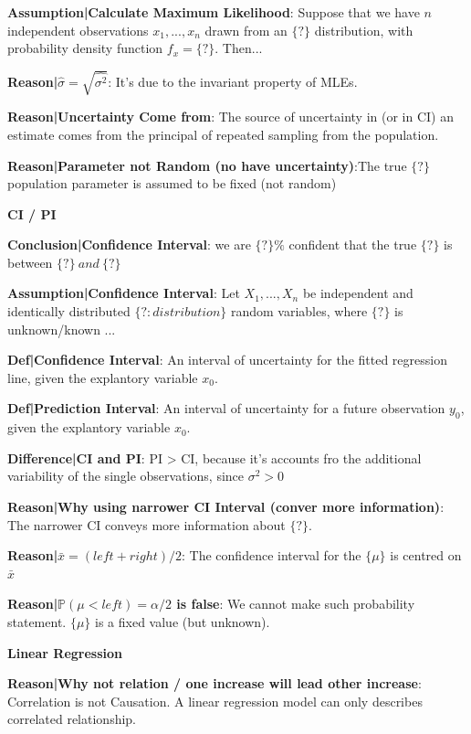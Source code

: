 \documentclass[9pt]{article}
\begin{document}
    \textbf{Assumption|Calculate Maximum Likelihood}: Suppose that we have $n$ independent observations $x_1,...,x_n$ drawn from an $\{?\}$ distribution, with probability density function $f_x=\{?\}$. Then...

    \textbf{Reason|$\hat{\sigma}=\sqrt{\hat{\sigma^2}}$}: It's due to the invariant property of MLEs.

    \textbf{Reason|Uncertainty Come from}: The source of uncertainty in (or in CI) an estimate comes from the principal of repeated sampling from the population. 

    \textbf{Reason|Parameter not Random (no have uncertainty)}:The true $\{?\}$ population parameter is assumed to be fixed (not random)

    \textbf{}

    \textbf{CI / PI}

    \textbf{Conclusion|Confidence Interval}: we are $\{?\}\%$ confident that the true $\{?\}$ is between $\{?\} \ and \ \{?\}$

    \textbf{Assumption|Confidence Interval}: Let $X_1,...,X_n$ be independent and identically distributed $\{?:distribution\}$ random variables, where $\{?\}$ is unknown/known ...

    \textbf{Def|Confidence Interval}: An interval of uncertainty for the fitted regression line, given the explantory variable $x_0$.

    \textbf{Def|Prediction Interval}: An interval of uncertainty for a future observation $y_0$, given the explantory variable $x_0$.

    \textbf{Difference|CI and PI}: PI > CI, because it's accounts fro the additional variability of the single observations, since $\sigma^2>0$

    \textbf{Reason|Why using narrower CI Interval (conver more information)}: The narrower CI conveys more information about $\{?\}$.

    \textbf{Reason|$\bar{x}=(left+right)/2$}: The confidence interval for the $\{\mu\}$ is centred on $\bar{x}$

    \textbf{Reason|$\mathbb{P}(\mu<left)=\alpha/2$ is false}: We cannot make such probability statement. $\{\mu\}$ is a fixed value (but unknown).

    \textbf{}

    \textbf{Linear Regression}

    \textbf{Reason|Why not relation / one increase will lead other increase}: Correlation is not Causation. A linear regression model can only describes correlated relationship.
\end{document}
